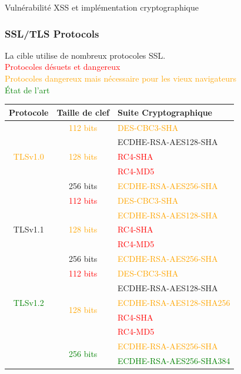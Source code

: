 \documentclass[twoside,a4paper,12pt,titlepage]{book}
\begin{document}
\begin{LongFlagConsole}{Vulnérabilité XSS et implémentation cryptographique}
{{\subsubsection*{SSL/TLS Protocols}
La cible utilise de nombreux protocoles SSL.\\
\indent \textcolor{red}{Protocoles désuets et dangereux}\\
\indent \textcolor{orange}{Protocoles dangereux mais nécessaire pour les vieux navigateurs}\\
\indent \textcolor{Green}{État de l'art}\\
\begin{tabular}{c c p{5cm} }
Protocole & Taille de clef & Suite Cryptographique \\\hline
\multirow{5}{*}{\textcolor{orange}{TLSv1.0}} & \textcolor{orange}{112 bits} & \textcolor{orange}{DES-CBC3-SHA}\\
								&\multirow{3}{*}{\textcolor{orange}{128 bits}} & ECDHE-RSA-AES128-SHA \\
								&									&\textcolor{red}{RC4-SHA}\\
								&									&\textcolor{red}{RC4-MD5}\\
								& 256 bits								& \textcolor{orange}{ECDHE-RSA-AES256-SHA}\\
\multirow{5}{*}{TLSv1.1} & \textcolor{red}{112 bits} & \textcolor{orange}{DES-CBC3-SHA}\\
								&\multirow{3}{*}{\textcolor{orange}{128 bits}} & \textcolor{orange}{ECDHE-RSA-AES128-SHA}\\
								&									&\textcolor{red}{RC4-SHA}\\
								&									&\textcolor{red}{RC4-MD5}\\
								& 256 bits								& \textcolor{orange}{ECDHE-RSA-AES256-SHA}\\
\multirow{5}{*}{\textcolor{Green}{TLSv1.2}} & \textcolor{red}{112 bits} & \textcolor{orange}{DES-CBC3-SHA}\\
								&\multirow{4}{*}{\textcolor{orange}{128 bits}} & ECDHE-RSA-AES128-SHA \\
								&									& \textcolor{orange}{ECDHE-RSA-AES128-SHA256}\\
								&									&\textcolor{red}{RC4-SHA}\\
								&									&\textcolor{red}{RC4-MD5}\\
								& \multirow{2}{*}{\textcolor{Green}{256 bits}}	& \textcolor{orange}{ECDHE-RSA-AES256-SHA}\\
								&									& \textcolor{Green}{ECDHE-RSA-AES256-SHA384}\\
\end{tabular}
}}\\[1cm]


\end{LongFlagConsole}
\end{document}
